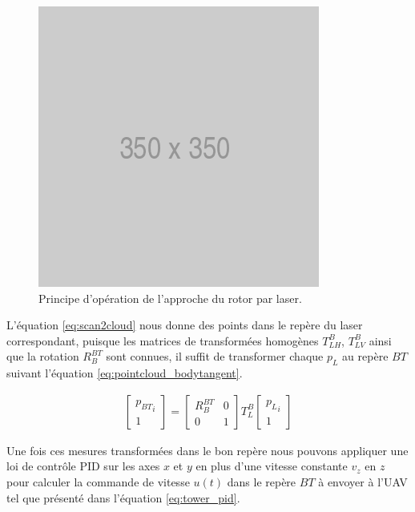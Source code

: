 \begin{figure}[htp]
  \centering
  \includegraphics[width=0.5\linewidth]{images/placeholder.png}
  \caption{Principe d'opération de l'approche du rotor par laser.}
  \label{fig:approach}
\end{figure}

L'équation \ref{eq:scan2cloud} nous donne des points dans le repère du laser correspondant, puisque les matrices de transformées homogènes $T_{LH}^B$, $T_{LV}^B$ ainsi que la rotation $R_B^{BT}$ sont connues, il suffit de transformer chaque $p_L$ au repère ${BT}$ suivant l'équation \ref{eq:pointcloud_bodytangent}.

\begin{align}
  \begin{bmatrix}{p_{BT}}_i \\ 1\end{bmatrix} = \begin{bmatrix}
    R_B^{BT} & 0 \\
    0 & 1
  \end{bmatrix} T_{L}^B\begin{bmatrix}{p_{L}}_i \\ 1\end{bmatrix}
  \label{eq:pointcloud_bodytangent}
\end{align}

Une fois ces mesures transformées dans le bon repère nous pouvons appliquer une loi de contrôle PID sur les axes $x$ et $y$ en plus d'une vitesse constante $v_z$ en $z$ pour calculer la commande de vitesse $u(t)$ dans le repère ${BT}$ à envoyer à l'UAV tel que présenté dans l'équation \ref{eq:tower_pid}.

